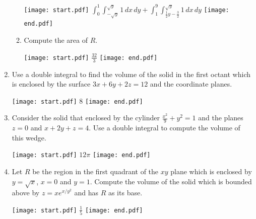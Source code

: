 \documentclass[12pt]{article}
\begin{document}
\begin{enumerate}
\begin{enumerate}
\texttt{[image: start.pdf]}
{{$\int_{0}^1 \int_{-\sqrt{y}}^{\sqrt{y}} 1 \,dx\,dy+\int_1^9 \int_{\frac{1}{2}y-\frac{3}{2}}^{\sqrt{y}} 1 \,dx\,dy$}}
\texttt{[image: end.pdf]}


\item Compute the area of $R$.

\texttt{[image: start.pdf]}
{{$\frac{32}{3}$}}
\texttt{[image: end.pdf]}


\end{enumerate}

\item Use a double integral to find the volume of the solid in the first octant which is enclosed by the surface $3x+6y+2z=12$ and the coordinate planes.

\texttt{[image: start.pdf]}
{{8}}
\texttt{[image: end.pdf]}


\item Consider the solid that enclosed by the cylinder $\frac{x^2}{9}+y^2=1$ and the planes $z=0$ and $x+2y+z=4$.  Use a double integral to compute the volume of this wedge.

\texttt{[image: start.pdf]}
{{$12\pi$}}
\texttt{[image: end.pdf]}


\item Let $R$ be the region in the first quadrant of the $xy$ plane which is enclosed by $y=\sqrt{x}$, $x=0$ and $y=1$.  Compute the volume of the solid which is bounded above by $z=xe^{x/y^2}$ and has $R$ as its base.

\texttt{[image: start.pdf]}
{{$\frac{1}{5}$}}
\texttt{[image: end.pdf]}


\end{enumerate}
\end{document}
